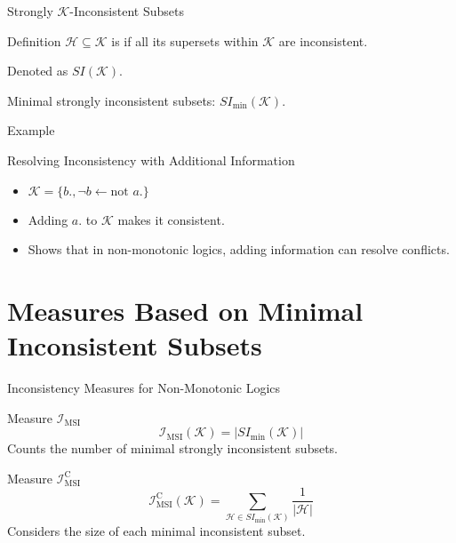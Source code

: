 \begin{frame}{Strongly $\mathcal{K}$-Inconsistent Subsets}
    \begin{block}{Definition}
        $\mathcal{H} \subseteq \mathcal{K}$ is  if all its supersets within $\mathcal{K}$ are inconsistent.

        Denoted as $SI(\mathcal{K})$.

        Minimal strongly inconsistent subsets: $SI_{\min}(\mathcal{K})$.
    \end{block}
\end{frame}

\begin{frame}{Example}
    \begin{exampleblock}{Resolving Inconsistency with Additional Information}
        \begin{itemize}
            \item $\mathcal{K} = \{b., \neg b \leftarrow \text{not } a.\}$
            \item Adding $a.$ to $\mathcal{K}$ makes it consistent.
            \item Shows that in non-monotonic logics, adding information can resolve conflicts.
        \end{itemize}
    \end{exampleblock}
\end{frame}

\section{Measures Based on Minimal Inconsistent Subsets}

\begin{frame}{Inconsistency Measures for Non-Monotonic Logics}
    \begin{block}{Measure $\mathcal{I}_{\text{MSI}}$}
        \[
            \mathcal{I}_{\text{MSI}}(\mathcal{K}) = \left| SI_{\min}(\mathcal{K}) \right|
        \]
        Counts the number of minimal strongly inconsistent subsets.
    \end{block}
    \begin{block}{Measure $\mathcal{I}_{\text{MSI}}^\text{C}$}
        \[
            \mathcal{I}_{\text{MSI}}^\text{C}(\mathcal{K}) = \sum_{\mathcal{H} \in SI_{\min}(\mathcal{K})} \frac{1}{|\mathcal{H}|}
        \]
        Considers the size of each minimal inconsistent subset.
    \end{block}
\end{frame}

